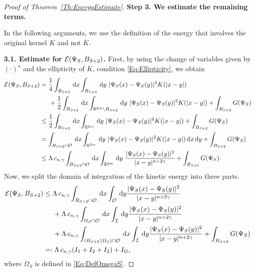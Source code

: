 \begin{proof}[Proof of Theorem~\ref{Th:EnergyEstimate}]
\textbf{Step 3. We estimate the remaining terms.}

In the following arguments, we use the definition of the energy that involves the original kernel $K$ and not $\overline{K}$.

\textbf{3.1. Estimate for $\mathcal{E}(\Psi_S,B_{S+2})$.}
First, by using the change of variables given by $(\cdot)^\star$ and the ellipticity of $K$, condition \eqref{Eq:Ellipticity}, we obtain
\begin{align*}
\ecal(\Psi_S,B_{S+2}) &= \frac{1}{4} \int_{B_{S+2}} \d x \int_{B_{S+2}} \d y\ |\Psi_S(x)-\Psi_S(y)|^2K(|x-y|)  \\
&\hspace{5mm} +\frac{1}{2} \int_{B_{S+2}} \d x \int_{\R^{2m} \setminus B_{S+2}} \d y \ |\Psi_S(x)-\Psi_S(y)|^2K(|x-y|) + \int_{B_{S+2}} G(\Psi_S) \\
&\leq \frac{1}{2} \int_{B_{S+2}} \d x \int_{\R^{2m}} \d y\ |\Psi_S(x)-\Psi_S(y)|^2K(|x-y|) + \int_{B_{S+2}} G(\Psi_S) \\
&= \int_{B_{S+2} \cap \ocal} \d x \int_{\R^{2m}} \d y\ |\Psi_S(x)-\Psi_S(y)|^2K(|x-y|) \d x\d y + \int_{B_{S+2}} G(\Psi_S) \\
&\leq \Lambda\, c_{n,\s} \int_{B_{S+2} \cap \ocal} \d x \int_{\R^{2m}} \d y \ \frac{|\Psi_S(x)-\Psi_S(y)|^2}{|x-y|^{n+2\s}} + \int_{B_{S+2}} G(\Psi_S).
\end{align*}
Now, we split the domain of integration of the kinetic energy into three parts.
\begin{align*}
\mathcal{E}(\Psi_S,B_{S+2}) &\leq \Lambda\, c_{n,\gamma} \int_{B_{S+2} \cap \mathcal{O}} \,\mathrm{d} x \int_{\mathcal{O}} \,\mathrm{d} y \frac{|\Psi_S(x)-\Psi_S(y)|^2}{|x-y|^{n+2\gamma}} \\
&\hspace{5mm} + \Lambda\, c_{n,\gamma} \int_{\Omega_S \cap \mathcal{O}} \,\mathrm{d} x \int_{\mathcal{I}} \,\mathrm{d} y \frac{|\Psi_S(x)-\Psi_S(y)|^2}{|x-y|^{n+2\gamma}} \\
&\hspace{5mm} + \Lambda\, c_{n,\gamma} \int_{(B_{S+2}\setminus \Omega_S) \cap \mathcal{O}} \,\mathrm{d} x \int_{\mathcal{I}} \,\mathrm{d} y \frac{|\Psi_S(x)-\Psi_S(y)|^2}{|x-y|^{n+2\gamma}} + \int_{B_{S+2}} G(\Psi_S) \\
&=:\Lambda\, c_{n,\gamma} (I_1+I_2+I_3)+I_G,
\end{align*}
where $\Omega_S$ is defined in \eqref{Eq:DefOmegaS}. 


\end{proof}
